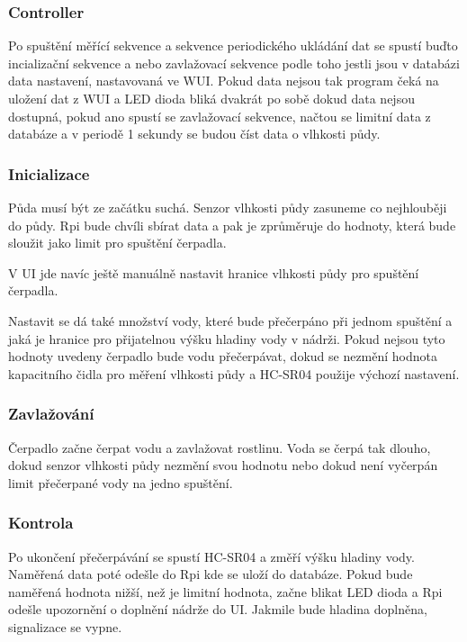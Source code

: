 \documentclass[12pt,a4paper]{article}
\begin{document}
\subsubsection{Controller}

Po spuštění měřící sekvence a sekvence periodického ukládání dat se spustí
buďto incializační sekvence a nebo zavlažovací sekvence podle toho jestli jsou
v databázi data nastavení, nastavovaná ve WUI. Pokud data nejsou tak program
čeká na uložení dat z WUI a LED dioda bliká dvakrát po sobě dokud data nejsou
dostupná, pokud ano spustí se zavlažovací sekvence, načtou se limitní data z
databáze a v periodě 1 sekundy se budou číst data o vlhkosti půdy.

\subsubsection{Inicializace}

Půda musí být ze začátku suchá. Senzor vlhkosti půdy zasuneme co nejhlouběji do
půdy. Rpi bude chvíli sbírat data a pak je zprůměruje do hodnoty, která bude
sloužit jako limit pro spuštění čerpadla.

V UI jde navíc ještě manuálně nastavit hranice vlhkosti půdy pro spuštění
čerpadla.

Nastavit se dá také množství vody, které bude přečerpáno při jednom spuštění a
jaká je hranice pro přijatelnou výšku hladiny vody v nádrži. Pokud nejsou tyto
hodnoty uvedeny čerpadlo bude vodu přečerpávat, dokud se nezmění hodnota
kapacitního čidla pro měření vlhkosti půdy a HC-SR04 použije výchozí nastavení.

\subsubsection{Zavlažování}

Čerpadlo začne čerpat vodu a zavlažovat rostlinu. Voda se čerpá tak dlouho,
dokud senzor vlhkosti půdy nezmění svou hodnotu nebo dokud není vyčerpán limit
přečerpané vody na jedno spuštění.

\subsubsection{Kontrola}

Po ukončení přečerpávání se spustí HC-SR04 a změří výšku hladiny vody. Naměřená
data poté odešle do Rpi kde se uloží do databáze. Pokud bude naměřená hodnota
nižší, než je limitní hodnota, začne blikat LED dioda a Rpi odešle upozornění o
doplnění nádrže do UI. Jakmile bude hladina doplněna, signalizace se vypne.
\end{document}
